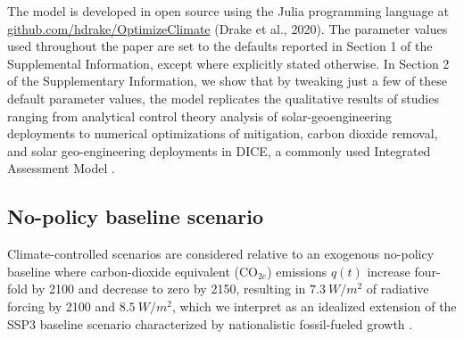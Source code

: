 \documentclass[9pt,twocolumn,twoside,lineno]{pnas-new}
\begin{document}
The model is developed in open source using the Julia programming language \cite{bezanson_julia:_2017} at \url{github.com/hdrake/OptimizeClimate} (Drake et al., 2020). The parameter values used throughout the paper are set to the defaults reported in Section 1 of the Supplemental Information, except where explicitly stated otherwise. In Section 2 of the Supplementary Information, we show that by tweaking just a few of these default parameter values, the model replicates the qualitative results of studies ranging from analytical control theory analysis of solar-geoengineering deployments \cite{soldatenko_optimal_2018} to numerical optimizations of mitigation, carbon dioxide removal, and solar geo-engineering deployments in DICE, a commonly used Integrated Assessment Model \cite{belaia_optimal_2019}.

\subsection*{No-policy baseline scenario}
Climate-controlled scenarios are considered relative to an exogenous no-policy baseline where carbon-dioxide equivalent (CO$_{2e}$) emissions $q(t)$ increase four-fold by 2100 and decrease to zero by 2150, resulting in $\SI{7.3}{W/m^{2}}$ of radiative forcing by 2100 and $\SI{8.5}{W/m^{2}}$, which we interpret as an idealized extension of the SSP3 baseline scenario characterized by nationalistic fossil-fueled growth \cite[][and Section A of Supplemental Information]{riahi_shared_2017}.
\end{document}
